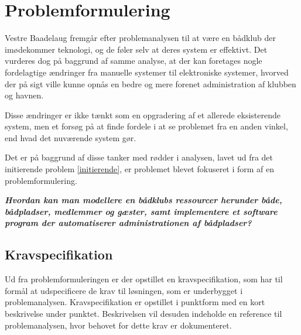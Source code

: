 \chapter{Problemformulering}
\label{cha:problemformulering}

Vestre Baadelaug fremgår efter problemanalysen til at være en bådklub der imødekommer teknologi, og de føler selv at deres system er effektivt. Det vurderes dog på baggrund af samme analyse, at der kan foretages nogle fordelagtige ændringer fra manuelle systemer til elektroniske systemer, hvorved der på sigt ville kunne opnås en bedre og mere forenet administration af klubben og havnen.

Disse ændringer er ikke tænkt som en opgradering af et allerede eksisterende system, men et forsøg på at finde fordele i at se problemet fra en anden vinkel, end hvad det nuværende system gør.

Det er på baggrund af disse tanker med rødder i analysen, lavet ud fra det initierende problem \ref{initierende}, er problemet blevet fokuseret i form af en problemformulering. 


\begin{displayquote}
\textbf{\textit{Hvordan kan man modellere en bådklubs ressourcer herunder både, bådpladser, medlemmer og gæster, samt implementere et software program der automatiserer administrationen af bådpladser?}}
\end{displayquote}

\section{Kravspecifikation} %
\label{sec:Kravspecifikation}

Ud fra problemformuleringen er der opstillet en kravspecifikation, som har til
formål at udspecificere de krav til løsningen, som er underbygget i problemanalysen. 
Kravspecifikation er opstillet i punktform med en kort beskrivelse 
under punktet. Beskrivelsen vil desuden indeholde en reference til problemanalysen, hvor 
behovet for dette krav er dokumenteret.
 

